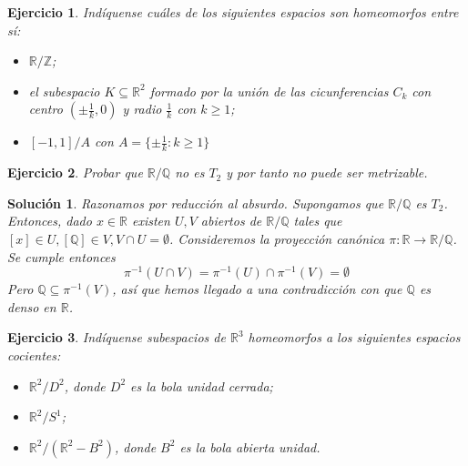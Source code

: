 \documentclass{article}
\theoremstyle{plain}
\newtheorem{exercise}{Ejercicio}
\newtheorem*{sol*}{Solución}
\newcommand{\R}{\mathbb{R}}
\newcommand{\Q}{\mathbb{Q}}
\begin{document}
\newpage
\begin{exercise}
Indíquense cuáles de los siguientes espacios son homeomorfos entre sí:
\begin{itemize}
	\item $\mathbb{R}/\mathbb{Z}$;
	\item el subespacio $K \subseteq \mathbb{R}^2$ formado por la unión de las cicunferencias $C_k$ con centro $(\pm \frac{1}{k},0)$ y radio $\frac{1}{k}$ con $k \geq 1$;
	\item $[-1,1]/A$ con $A = \{ \pm \frac{1}{k} : k \geq 1\}$
\end{itemize}
\end{exercise}


\newpage
\begin{exercise}
Probar que $\mathbb{R}/\mathbb{Q}$ no es $T_2$ y por tanto no puede ser metrizable.
\end{exercise}
\begin{sol*}
Razonamos por reducción al absurdo. Supongamos que $\mathbb{R}/\mathbb{Q}$ es $T_2$. Entonces, dado $x\in\R$ existen $U,V$ abiertos de $\mathbb{R}/\mathbb{Q}$ tales que $[x]\in U, [\Q]\in V, V\cap U=\emptyset$. Consideremos la proyección canónica $\pi:\R\rightarrow\mathbb{R}/\mathbb{Q}$. Se cumple entonces
\[\pi^{-1}(U\cap V)=\pi^{-1}(U)\cap\pi^{-1}(V)=\emptyset\]
Pero $\Q\subseteq \pi^{-1}(V)$, así que hemos llegado a una contradicción con que $\Q$ es denso en $\R$. 
\end{sol*}


\newpage
\begin{exercise}
Indíquense subespacios de $\mathbb{R}^3$ homeomorfos a los siguientes espacios cocientes:
\begin{itemize}
	\item $\mathbb{R}^2/D^2$, donde $D^2$ es la bola unidad cerrada;
	\item $\mathbb{R}^2/S^1$;
	\item $\mathbb{R}^2/(\mathbb{R}^2-B^2)$, donde $B^2$ es la bola abierta unidad.
\end{itemize}
\end{exercise}
\end{document}
